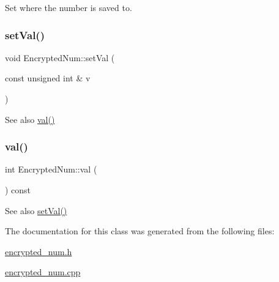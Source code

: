 Set where the number is saved to. 

\mbox{\label{class_encrypted_num_a4469ba057a691e6edacc25022596d1fa}} 
\subsubsection{\texorpdfstring{set\+Val()}{setVal()}}
{\footnotesize\ttfamily void Encrypted\+Num\+::set\+Val (\begin{DoxyParamCaption}\item[{const unsigned int \&}]{v }\end{DoxyParamCaption})\hspace{0.3cm}{\ttfamily [virtual]}}

\begin{DoxySeeAlso}{See also}
\mbox{\hyperlink{class_encrypted_num_a3cb78d22a4bbb6bd3199bcf10de04366}{val()}} 
\end{DoxySeeAlso}
\mbox{\label{class_encrypted_num_a3cb78d22a4bbb6bd3199bcf10de04366}} 
\subsubsection{\texorpdfstring{val()}{val()}}
{\footnotesize\ttfamily int Encrypted\+Num\+::val (\begin{DoxyParamCaption}{ }\end{DoxyParamCaption}) const\hspace{0.3cm}{\ttfamily [virtual]}}

\begin{DoxySeeAlso}{See also}
\mbox{\hyperlink{class_encrypted_num_a4469ba057a691e6edacc25022596d1fa}{set\+Val()}} 
\end{DoxySeeAlso}


The documentation for this class was generated from the following files\+:\begin{DoxyCompactItemize}
\item 
\mbox{\hyperlink{encrypted__num_8h}{encrypted\+\_\+num.\+h}}\item 
\mbox{\hyperlink{encrypted__num_8cpp}{encrypted\+\_\+num.\+cpp}}\end{DoxyCompactItemize}
